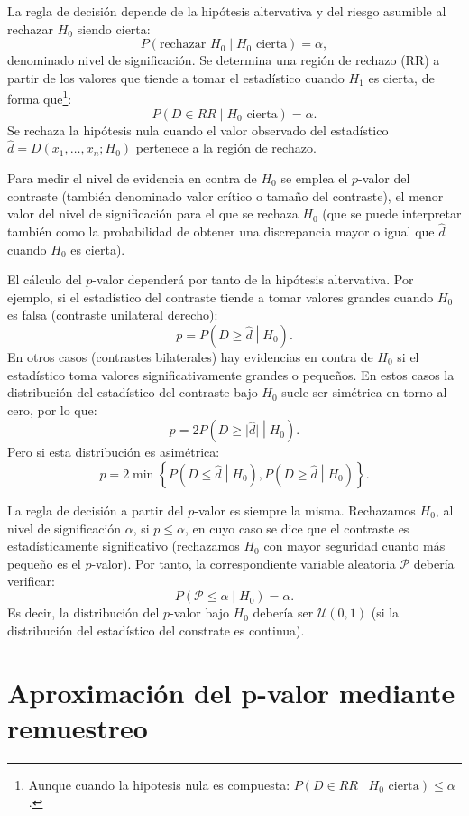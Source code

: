 \documentclass[
]{book}
\theoremstyle{definition}
\theoremstyle{definition}
\theoremstyle{definition}
\theoremstyle{remark}
\begin{document}
La regla de decisión depende de la hipótesis altervativa y
del riesgo asumible al rechazar \(H_0\) siendo cierta:
\[P\left( \text{rechazar }H_0\mid H_0\text{ cierta}\right) =\alpha,\]
denominado nivel de significación.
Se determina una región de rechazo (RR) a partir de los valores que tiende
a tomar el estadístico cuando \(H_1\) es cierta,
de forma que\footnote{Aunque cuando la hipotesis nula es compuesta:
  \(P\left( D\in RR \mid H_0\text{ cierta}\right) \leq \alpha\).}:
\[P\left( D\in RR \mid H_0\text{ cierta}\right) =\alpha.\]
Se rechaza la hipótesis nula cuando el valor observado del
estadístico \(\hat{d}=D\left( x_1,\ldots ,x_n;H_0\right)\) pertenece
a la región de rechazo.

Para medir el nivel de evidencia en contra de \(H_0\) se emplea el
\(p\)-valor del contraste (también denominado valor crítico o
tamaño del contraste), el menor valor del nivel
de significación para el que se rechaza \(H_0\)
(que se puede interpretar también como la
probabilidad de obtener una discrepancia mayor o igual que
\(\hat{d}\) cuando \(H_0\) es cierta).

El cálculo del \(p\)-valor dependerá por tanto de la hipótesis altervativa.
Por ejemplo, si el estadístico del contraste tiende a tomar valores
grandes cuando \(H_0\) es falsa (contraste unilateral derecho):
\[p = P\left( D \geq \hat{d} \middle| H_0\right).\]
En otros casos (contrastes bilaterales) hay evidencias en contra de
\(H_0\) si el estadístico toma valores significativamente grandes o pequeños.
En estos casos la distribución del estadístico del contraste bajo \(H_0\)
suele ser simétrica en torno al cero, por lo que:
\[p = 2P\left( D \geq \vert \hat{d} \vert \middle| H_0 \right).\]
Pero si esta distribución es asimétrica:
\[p = 2 \min \left\{ P\left( D \leq \hat{d} \middle| H_0 \right),
P\left( D \geq \hat{d} \middle| H_0\right) \right\}.\]

La regla de decisión a partir del \(p\)-valor es siempre la misma.
Rechazamos \(H_0\), al nivel de significación \(\alpha\), si \(p \leq \alpha\),
en cuyo caso se dice que el contraste es estadísticamente significativo
(rechazamos \(H_0\) con mayor seguridad cuanto más pequeño es el \(p\)-valor).
Por tanto, la correspondiente variable aleatoria \(\mathcal{P}\) debería verificar:
\[P\left( \mathcal{P} \leq \alpha \middle| H_0\right)= \alpha.\]
Es decir, la distribución del \(p\)-valor bajo \(H_0\) debería ser \(\mathcal{U}(0,1)\)
(si la distribución del estadístico del constrate es continua).

\hypertarget{aproximaciuxf3n-del-p-valor-mediante-remuestreo}{%
\section{Aproximación del p-valor mediante remuestreo}\label{aproximaciuxf3n-del-p-valor-mediante-remuestreo}}
\end{document}
